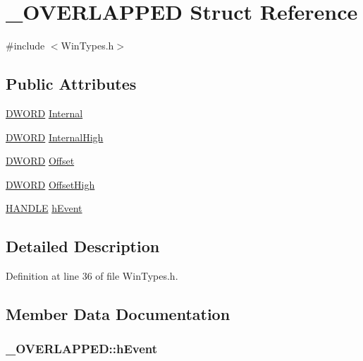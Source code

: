 \hypertarget{struct__OVERLAPPED}{
\section{\_\-OVERLAPPED Struct Reference}
\label{struct__OVERLAPPED}
}


{\ttfamily \#include $<$WinTypes.h$>$}\subsection*{Public Attributes}
\begin{DoxyCompactItemize}
\item 
\hyperlink{LALUsbx64_2include_2WinTypes_8h_ad342ac907eb044443153a22f964bf0af}{DWORD} \hyperlink{struct__OVERLAPPED_a2253d58d3120adff7f6d0242400bc7b4}{Internal}
\item 
\hyperlink{LALUsbx64_2include_2WinTypes_8h_ad342ac907eb044443153a22f964bf0af}{DWORD} \hyperlink{struct__OVERLAPPED_a577d8d492b8872fb1840947e2d2b06a7}{InternalHigh}
\item 
\hyperlink{LALUsbx64_2include_2WinTypes_8h_ad342ac907eb044443153a22f964bf0af}{DWORD} \hyperlink{struct__OVERLAPPED_a60b84fb65a45c8383a5274b38a3f4896}{Offset}
\item 
\hyperlink{LALUsbx64_2include_2WinTypes_8h_ad342ac907eb044443153a22f964bf0af}{DWORD} \hyperlink{struct__OVERLAPPED_a07370c1d35023959e51450a8e91c5a32}{OffsetHigh}
\item 
\hyperlink{LALUsbx64_2include_2WinTypes_8h_aa8c0374618b33785ccb02f74bcfebc46}{HANDLE} \hyperlink{struct__OVERLAPPED_aa34d425458cd9ae57e8a8bf5aadc2923}{hEvent}
\end{DoxyCompactItemize}


\subsection{Detailed Description}


Definition at line 36 of file WinTypes.h.

\subsection{Member Data Documentation}
\hypertarget{struct__OVERLAPPED_aa34d425458cd9ae57e8a8bf5aadc2923}{
\subsubsection[{hEvent}]{ {\bf \_\-OVERLAPPED::hEvent}}}
\label{struct__OVERLAPPED_aa34d425458cd9ae57e8a8bf5aadc2923}


